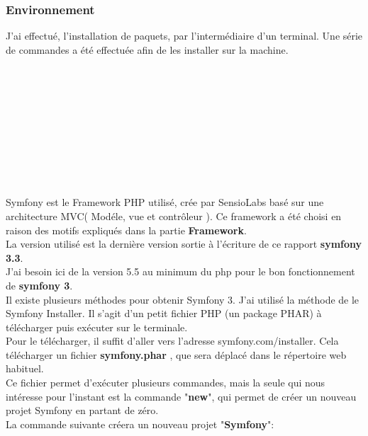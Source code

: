 \documentclass[12pt]{article}
\begin{document}
\subsubsection{Environnement}
J'ai effectué, l'installation de paquets, par l'intermédiaire d'un terminal. Une série de commandes a été effectuée afin de les installer sur la machine.
\\

\\

\\

\\

\\

\\

\\

\\

\\

   
     
\\
\\
Symfony est le Framework PHP utilisé, crée par SensioLabs basé sur une
architecture MVC( Modéle, vue et contrôleur ). Ce framework a été choisi
en raison des motifs expliqués dans la partie \textbf{Framework}.\\
La version utilisé est la dernière version sortie à l’écriture de ce rapport \textbf{symfony 3.3}.
\\ 
J'ai besoin ici de la version 5.5 au minimum du php pour le bon fonctionnement de \textbf{symfony 3}.\\
Il existe plusieurs méthodes pour obtenir Symfony 3. J'ai utilisé la méthode de le Symfony Installer. Il s'agit d'un petit fichier PHP (un package PHAR) à télécharger puis exécuter sur le terminale.\\

Pour le télécharger, il suffit d'aller vers l'adresse  symfony.com/installer. Cela  télécharger un fichier \textbf{symfony.phar} , que sera déplacé dans le répertoire web habituel. \\
Ce fichier permet d'exécuter plusieurs commandes, mais la seule qui nous intéresse pour l'instant est la commande "\textbf{new}", qui permet de créer un nouveau projet Symfony en partant de zéro.\\
La commande suivante créera un nouveau projet  "\textbf{Symfony}":\\
\\
 \\
\end{document}
